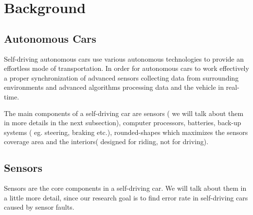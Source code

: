 \section{Background}
\subsection{ Autonomous Cars}
Self-driving autonomous cars use various autonomous technologies to provide an effortless mode of transportation. In order for autonomous cars to work effectively a proper synchronization of advanced sensors collecting data from surrounding environments and advanced algorithms processing data and the vehicle in real-time.

The main components of a self-driving car are sensors ( we will talk about them in more details in the next subsection), computer processors, batteries, back-up systems ( eg. steering, braking etc.), rounded-shapes which maximizes the sensors coverage area and the interiors( designed for riding, not for driving). 

\subsection{Sensors}
Sensors are the core components in a self-driving car. We will talk about them in a little more detail, since our research goal is to find error rate in self-driving cars caused by sensor faults.

